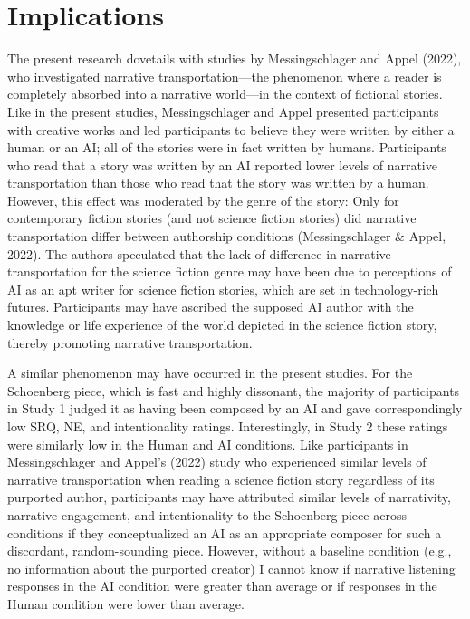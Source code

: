 \documentclass[12pt,twoside]{reedthesis}
\begin{document}
\section*{Implications}

The present research dovetails with studies by Messingschlager and Appel (2022), who investigated narrative transportation—the phenomenon where a reader is completely absorbed into a narrative world—in the context of fictional stories. Like in the present studies, Messingschlager and Appel presented participants with creative works and led participants to believe they were written by either a human or an AI; all of the stories were in fact written by humans. Participants who read that a story was written by an AI reported lower levels of narrative transportation than those who read that the story was written by a human. However, this effect was moderated by the genre of the story: Only for contemporary fiction stories (and not science fiction stories) did narrative transportation differ between authorship conditions (Messingschlager \& Appel, 2022). The authors speculated that the lack of difference in narrative transportation for the science fiction genre may have been due to perceptions of AI as an apt writer for science fiction stories, which are set in technology-rich futures. Participants may have ascribed the supposed AI author with the knowledge or life experience of the world depicted in the science fiction story, thereby promoting narrative transportation.

A similar phenomenon may have occurred in the present studies. For the Schoenberg piece, which is fast and highly dissonant, the majority of participants in Study 1 judged it as having been composed by an AI and gave correspondingly low SRQ, NE, and intentionality ratings. Interestingly, in Study 2 these ratings were similarly low in the Human and AI conditions. Like participants in Messingschlager and Appel’s (2022) study who experienced similar levels of narrative transportation when reading a science fiction story regardless of its purported author, participants may have attributed similar levels of narrativity, narrative engagement, and intentionality to the Schoenberg piece across conditions if they conceptualized an AI as an appropriate composer for such a discordant, random-sounding piece. However, without a baseline condition (e.g., no information about the purported creator) I cannot know if narrative listening responses in the AI condition were greater than average or if responses in the Human condition were lower than average.
\end{document}
